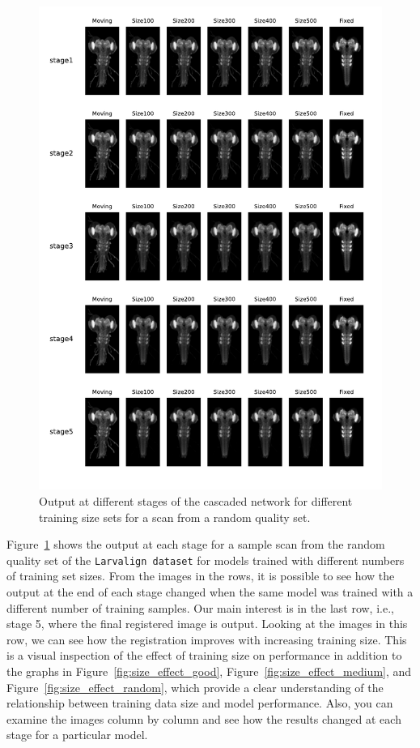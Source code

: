 \documentclass{book}
\begin{document}
	\begin{figure}[h!]
		\centering
		\includegraphics[width=\columnwidth]{resources/ablation_size/stage_vs_size_random.pdf}
		\caption{Output at different stages of the cascaded network for different training size sets for a scan from a random quality set.}
		\label{fig:stage_vs_size_random}
	\end{figure}
	
	Figure~\ref{fig:stage_vs_size_random} shows the output at each stage for a sample scan from the random quality set of the \texttt{Larvalign dataset} for models trained with different numbers of training set sizes. From the images in the rows, it is possible to see how the output at the end of each stage changed when the same model was trained with a different number of training samples. Our main interest is in the last row, i.e., stage 5, where the final registered image is output. Looking at the images in this row, we can see how the registration improves with increasing training size. This is a visual inspection of the effect of training size on performance in addition to the graphs in Figure~\ref{fig:size_effect_good}, Figure~\ref{fig:size_effect_medium}, and Figure~\ref{fig:size_effect_random}, which provide a clear understanding of the relationship between training data size and model performance. Also, you can examine the images column by column and see how the results changed at each stage for a particular model.
	
\end{document}
